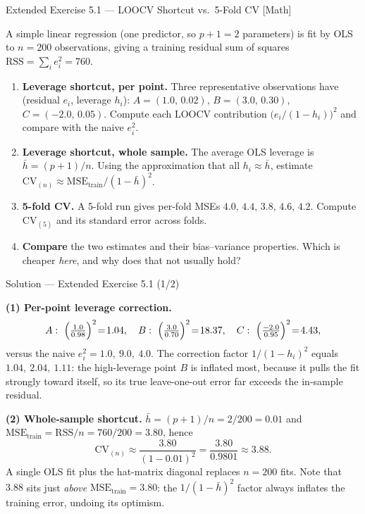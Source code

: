 \documentclass[aspectratio=169,11pt]{beamer}
\begin{document}
\begin{frame}{Extended Exercise 5.1 --- LOOCV Shortcut vs.\ 5-Fold CV [Math]}
  \begin{longexercise}
    A simple linear regression (one predictor, so $p+1=2$ parameters) is
    fit by OLS to $n = 200$ observations, giving a training residual sum
    of squares $\mathrm{RSS} = \sum_i e_i^2 = 760$.
    \begin{enumerate}
      \item \textbf{Leverage shortcut, per point.} Three representative
            observations have (residual $e_i$, leverage $h_i$):
            $A=(1.0,\,0.02)$, $B=(3.0,\,0.30)$, $C=(-2.0,\,0.05)$.
            Compute each LOOCV contribution $\bigl(e_i/(1-h_i)\bigr)^2$
            and compare with the naive $e_i^2$.
      \item \textbf{Leverage shortcut, whole sample.} The average OLS
            leverage is $\bar h=(p+1)/n$. Using the approximation that
            all $h_i\approx\bar h$, estimate
            $\mathrm{CV}_{(n)}\approx \mathrm{MSE}_{\text{train}}/(1-\bar h)^2$.
      \item \textbf{5-fold CV.} A 5-fold run gives per-fold MSEs
            $4.0,\,4.4,\,3.8,\,4.6,\,4.2$. Compute $\mathrm{CV}_{(5)}$ and
            its standard error across folds.
      \item \textbf{Compare} the two estimates and their bias--variance
            properties. Which is cheaper \emph{here}, and why does that
            not usually hold?
    \end{enumerate}
  \end{longexercise}
\end{frame}

\begin{frame}{Solution --- Extended Exercise 5.1 (1/2)}
  \begin{solutionbox}
    \textbf{(1) Per-point leverage correction.}
    \[
      A:\ \Bigl(\tfrac{1.0}{0.98}\Bigr)^2\!=\!1.04,\quad
      B:\ \Bigl(\tfrac{3.0}{0.70}\Bigr)^2\!=\!18.37,\quad
      C:\ \Bigl(\tfrac{-2.0}{0.95}\Bigr)^2\!=\!4.43,
    \]
    versus the naive $e_i^2 = 1.0,\ 9.0,\ 4.0$. The correction factor
    $1/(1-h_i)^2$ equals $1.04,\ 2.04,\ 1.11$: the high-leverage point
    $B$ is inflated most, because it pulls the fit strongly toward
    itself, so its true leave-one-out error far exceeds the in-sample
    residual.

    \textbf{(2) Whole-sample shortcut.}
    $\bar h=(p+1)/n=2/200=0.01$ and
    $\mathrm{MSE}_{\text{train}}=\mathrm{RSS}/n=760/200=3.80$, hence
    \[
      \mathrm{CV}_{(n)}\approx\frac{3.80}{(1-0.01)^2}
      =\frac{3.80}{0.9801}\approx 3.88 .
    \]
    A single OLS fit plus the hat-matrix diagonal replaces $n=200$ fits.
    Note that $3.88$ sits just \emph{above}
    $\mathrm{MSE}_{\text{train}} = 3.80$: the $1/(1-\bar h)^2$ factor
    always inflates the training error, undoing its optimism.
  \end{solutionbox}
\end{frame}
\end{document}
